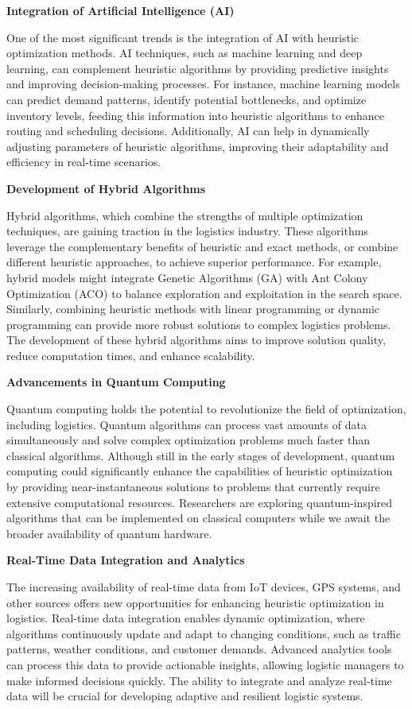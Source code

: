 \documentclass{article}
\begin{document}
    \textbf{Integration of Artificial Intelligence (AI)}

    One of the most significant trends is the integration of AI with heuristic optimization methods. AI techniques, such as machine learning and deep learning, can complement heuristic algorithms by providing predictive insights and improving decision-making processes. For instance, machine learning models can predict demand patterns, identify potential bottlenecks, and optimize inventory levels, feeding this information into heuristic algorithms to enhance routing and scheduling decisions. Additionally, AI can help in dynamically adjusting parameters of heuristic algorithms, improving their adaptability and efficiency in real-time scenarios.

    \textbf{Development of Hybrid Algorithms}

    Hybrid algorithms, which combine the strengths of multiple optimization techniques, are gaining traction in the logistics industry. These algorithms leverage the complementary benefits of heuristic and exact methods, or combine different heuristic approaches, to achieve superior performance. For example, hybrid models might integrate Genetic Algorithms (GA) with Ant Colony Optimization (ACO) to balance exploration and exploitation in the search space. Similarly, combining heuristic methods with linear programming or dynamic programming can provide more robust solutions to complex logistics problems. The development of these hybrid algorithms aims to improve solution quality, reduce computation times, and enhance scalability.

    \textbf{Advancements in Quantum Computing}

    Quantum computing holds the potential to revolutionize the field of optimization, including logistics. Quantum algorithms can process vast amounts of data simultaneously and solve complex optimization problems much faster than classical algorithms. Although still in the early stages of development, quantum computing could significantly enhance the capabilities of heuristic optimization by providing near-instantaneous solutions to problems that currently require extensive computational resources. Researchers are exploring quantum-inspired algorithms that can be implemented on classical computers while we await the broader availability of quantum hardware.

    \textbf{Real-Time Data Integration and Analytics}

    The increasing availability of real-time data from IoT devices, GPS systems, and other sources offers new opportunities for enhancing heuristic optimization in logistics. Real-time data integration enables dynamic optimization, where algorithms continuously update and adapt to changing conditions, such as traffic patterns, weather conditions, and customer demands. Advanced analytics tools can process this data to provide actionable insights, allowing logistic managers to make informed decisions quickly. The ability to integrate and analyze real-time data will be crucial for developing adaptive and resilient logistic systems.
\end{document}
